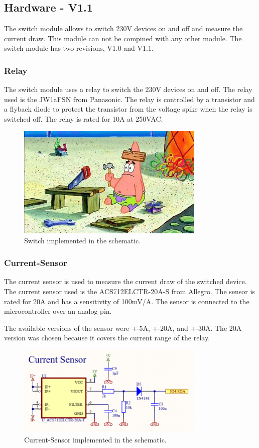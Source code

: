 \subsection{Hardware - V1.1}

    The switch module allows to switch 230V devices on and off and measure the current draw. 
    This module can not be compined with any other module. The switch module has two revisions,
    V1.0 and V1.1.

    \subsubsection{Relay}
        The switch module uses a relay to switch the 230V devices on and off. The relay used is 
        the JW1aFSN from Panasonic. The relay is controlled by a transistor and a flyback diode
        to protect the transistor from the voltage spike when the relay is switched off. The relay
        is rated for 10A at 250VAC.

        \begin{figure}[H]
            \centering
            \includegraphics[width=0.8\textwidth]{assets/HW/TBD.png}
            \caption{Switch implemented in the schematic.}
        \end{figure}
    
    \subsubsection{Current-Sensor}

        The current sensor is used to measure the current draw of the switched device. The current
        sensor used is the ACS712ELCTR-20A-S from Allegro. The sensor is rated for 20A and has a sensitivity of 
        100mV/A. The sensor is connected to the microcontroller over an analog pin.

        The available versions of the sensor were +-5A, +-20A, and +-30A. The 20A version was 
        chosen because it covers the current range of the relay.
        

        \begin{figure}[H]
            \centering
            \includegraphics[width=0.8\textwidth]{assets/HW/Current-Sensor-schematic.png}
            \caption{Current-Sensor implemented in the schematic.}
        \end{figure}